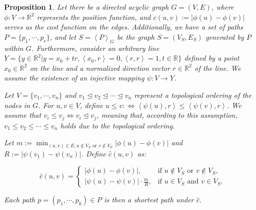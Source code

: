 \documentclass[11pt]{scrartcl}
\newtheorem{proposition}{Proposition}[section]
\begin{document}
\begin{proposition}
Let there be a directed acyclic graph $G = (V,E)$, where $\phi: V \rightarrow \mathbb{R}^2$ represents the position function, and $c(u,v) := |\phi(u)-\phi(v)|$ serves as the cost function on the edges. Additionally, we have a set of paths $P = \{p_1,\cdots,p_r\}$, and let $S = \left < P \right >_G$ be the graph $S=(V_S,E_S)$ generated by $P$ within $G$. Furthermore, consider an arbitrary line $Y = \{ y \in \mathbb{R}^2| y = x_0 + t r , \left < x_0, r \right > = 0, \left < r,r\right > = 1 , t \in \mathbb{R}\}$ defined by a point $x_0 \in \mathbb{R}^2$ on the line and a normalized direction vector $r \in \mathbb{R}^2$ of the line. We assume the existence of an injective mapping $\psi:V \rightarrow Y$.

Let $V = \{v_1,\cdots,v_n\}$ and $v_1 \trianglelefteq v_2 \trianglelefteq \cdots \trianglelefteq v_n$ represent a topological ordering of the nodes in $G$. For $u,v \in V$, define $u \le v :\iff \left < \psi(u), r \right > \le \left <\psi(v), r \right >$. We assume that $v_i \leq v_j \iff v_i \trianglelefteq v_j$, meaning that, according to this assumption, $v_1 \le v_2 \le \cdots \le v_n$ holds due to the topological ordering.

Let $m:= \min_{ (u,v) \in E, u \notin V_S \text{ or } v \notin V_S} |\phi(u)-\phi(v)|$ and $R:=|\psi(v_1)-\psi(v_n)|$. Define $\hat{c}(u,v)$ as:

\[
\hat{c}(u,v) = 
\begin{cases}
|\phi(u)-\phi(v)|, & \text{if } u \notin V_S \text{ or } v \notin V_S, \\
|\psi(u)-\psi(v)|\cdot \frac{m}{R}, & \text{if } u \in V_S \text{ and } v \in V_S.
\end{cases}
\]

Each path $p = (p_1,\cdots,p_k) \in P$ is then a shortest path under $\hat{c}$.

\end{proposition}
\end{document}
